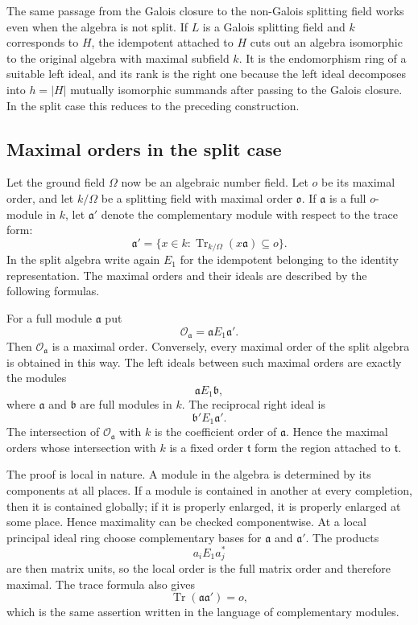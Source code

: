 \documentclass[11pt]{article}
\begin{document}
The same passage from the Galois closure to the non-Galois splitting field works even when the algebra is not split. If \(L\) is a Galois splitting field and \(k\) corresponds to \(H\), the idempotent attached to \(H\) cuts out an algebra isomorphic to the original algebra with maximal subfield \(k\). It is the endomorphism ring of a suitable left ideal, and its rank is the right one because the left ideal decomposes into \(h=|H|\) mutually isomorphic summands after passing to the Galois closure. In the split case this reduces to the preceding construction.

\subsection{Maximal orders in the split case}

Let the ground field \(\Omega\) now be an algebraic number field. Let \(o\) be its maximal order, and let \(k/\Omega\) be a splitting field with maximal order \(\mathfrak o\). If \(\mathfrak a\) is a full \(o\)-module in \(k\), let \(\mathfrak a'\) denote the complementary module with respect to the trace form:
\[
  \mathfrak a'=\{x\in k: \operatorname{Tr}_{k/\Omega}(x\mathfrak a)\subseteq o\}.
\]
In the split algebra write again \(E_1\) for the idempotent belonging to the identity representation. The maximal orders and their ideals are described by the following formulas.

For a full module \(\mathfrak a\) put
\[
  \mathcal O_{\mathfrak a}=\mathfrak a E_1\mathfrak a'.
\]
Then \(\mathcal O_{\mathfrak a}\) is a maximal order. Conversely, every maximal order of the split algebra is obtained in this way. The left ideals between such maximal orders are exactly the modules
\[
  \mathfrak aE_1\mathfrak b,
\]
where \(\mathfrak a\) and \(\mathfrak b\) are full modules in \(k\). The reciprocal right ideal is
\[
  \mathfrak b'E_1\mathfrak a'.
\]
The intersection of \(\mathcal O_{\mathfrak a}\) with \(k\) is the coefficient order of \(\mathfrak a\). Hence the maximal orders whose intersection with \(k\) is a fixed order \(\mathfrak t\) form the region attached to \(\mathfrak t\).

The proof is local in nature. A module in the algebra is determined by its components at all places. If a module is contained in another at every completion, then it is contained globally; if it is properly enlarged, it is properly enlarged at some place. Hence maximality can be checked componentwise. At a local principal ideal ring choose complementary bases for \(\mathfrak a\) and \(\mathfrak a'\). The products
\[
  a_iE_1a_j^*
\]
are then matrix units, so the local order is the full matrix order and therefore maximal. The trace formula also gives
\[
  \operatorname{Tr}(\mathfrak a\mathfrak a')=o,
\]
which is the same assertion written in the language of complementary modules.
\end{document}
